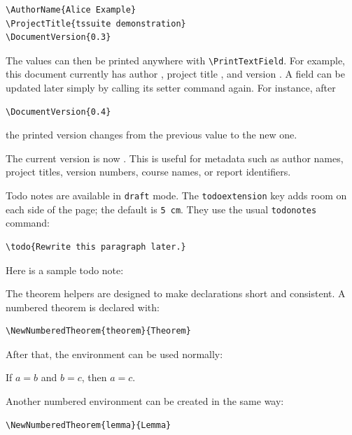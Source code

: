 \documentclass[a4paper,11pt]{article}
\newcommand{\pkg}[1]{\texttt{#1}}
\begin{document}
\begin{verbatim}
\AuthorName{Alice Example}
\ProjectTitle{tssuite demonstration}
\DocumentVersion{0.3}
\end{verbatim}

The values can then be printed anywhere with \verb|\PrintTextField|.  For
example, this document currently has author
, project title , and version
.  A field can be updated later simply by calling its
setter command again.  For instance, after

\begin{verbatim}
\DocumentVersion{0.4}
\end{verbatim}

the printed version changes from the previous value to the new one.


The current version is now .  This is useful for
metadata such as author names, project titles, version numbers, course names,
or report identifiers.

Todo notes are available in \verb|draft| mode.  The \verb|todoextension| key
adds room on each side of the page; the default is \texttt{5\,cm}.  They use
the usual
\pkg{todonotes} command:

\begin{verbatim}
\todo{Rewrite this paragraph later.}
\end{verbatim}

Here is a sample todo note:


The theorem helpers are designed to make declarations short and consistent.
A numbered theorem is declared with:

\begin{verbatim}
\NewNumberedTheorem{theorem}{Theorem}
\end{verbatim}

After that, the environment can be used normally:

\begin{theorem}
If $a=b$ and $b=c$, then $a=c$.
\end{theorem}

Another numbered environment can be created in the same way:

\begin{verbatim}
\NewNumberedTheorem{lemma}{Lemma}
\end{verbatim}
\end{document}
